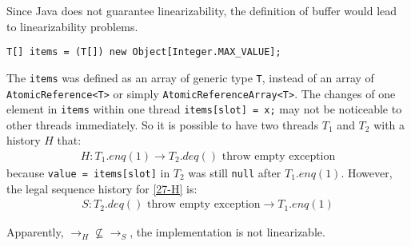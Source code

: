 \documentclass[]{article}
\begin{document}
Since Java does not guarantee linearizability, the definition of buffer would
lead to linearizability problems.
\begin{lstlisting}
T[] items = (T[]) new Object[Integer.MAX_VALUE];
\end{lstlisting}
The \lstinline{items} was defined as an array of generic type \lstinline{T},
instead of an array of \lstinline{AtomicReference<T>} or simply
\lstinline{AtomicReferenceArray<T>}. The changes of one element in
\lstinline{items} within one thread \lstinline{items[slot] = x;} may not be
noticeable to other threads immediately. So it is possible to have two threads
$T_1$ and $T_2$ with a history $H$ that:
\begin{align}
    \label{27-H}
    H: T_1.enq(1) \rightarrow T_2.deq() \text{ throw empty exception}
\end{align}
because \lstinline{value = items[slot]} in $T_2$ was still \lstinline{null}
after $T_1.enq(1)$. However, the legal sequence history for \cref{27-H} is:
\begin{align}
    \label{27-S}
    S: T_2.deq() \text{ throw empty exception} \rightarrow T_1.enq(1)
\end{align}

Apparently, $\rightarrow_H \nsubseteq \rightarrow_S$, the implementation is not
linearizable.
\end{document}
